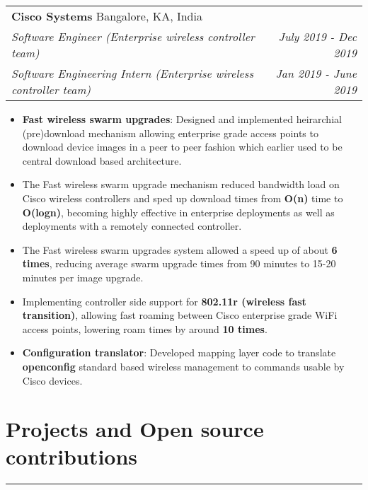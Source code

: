 \documentclass[a4paper,6pt]{article}
\begin{document}
\vspace{4px}
\hspace{5px}
\begin{tabularx}{\textwidth}{X r}
	\large{\textbf{Cisco Systems}} \small Bangalore, KA, India& \\
	\textit{\small Software Engineer (Enterprise wireless controller team)} & \textit{July 2019 - Dec 2019} \\
	\textit{\small Software Engineering Intern  (Enterprise wireless controller team)}& \textit{Jan 2019 - June 2019} \\
\end{tabularx}

\small
\begin{itemize}
	\itemsep0em
	\item \textcolor{mygray}{\textbf{Fast wireless swarm upgrades}}: Designed and implemented heirarchial (pre)download mechanism allowing enterprise grade access points to download device images in a peer to peer fashion which earlier used to be central download based architecture. 
        \item The Fast wireless swarm upgrade mechanism reduced bandwidth load on Cisco wireless controllers and sped up download times from \textcolor{mygray}{\textbf{O(n)}} time to \textcolor{mygray}{\textbf{O(logn)}}, becoming highly effective in enterprise deployments as well as deployments with a remotely connected controller.
        \item The Fast wireless swarm upgrades system allowed a speed up of about \textcolor{mygray}{\textbf{6 times}}, reducing average swarm upgrade times from 90 minutes to 15-20 minutes per image upgrade.
	\item  Implementing controller side support for \textcolor{mygray}{\textbf{802.11r (wireless fast transition)}}, allowing fast roaming between Cisco enterprise grade WiFi access points, lowering roam times by around \textcolor{mygray}{\textbf{10 times}}.
    \item \textcolor{mygray}{\textbf{Configuration translator}}: Developed mapping layer code to translate \textcolor{mygray}{\textbf{openconfig}} standard based wireless management to commands usable by Cisco devices. 
\end{itemize}

\section*{Projects and Open source contributions}
\vspace{-8px}
\hrule
\vspace{4px}
\end{document}
